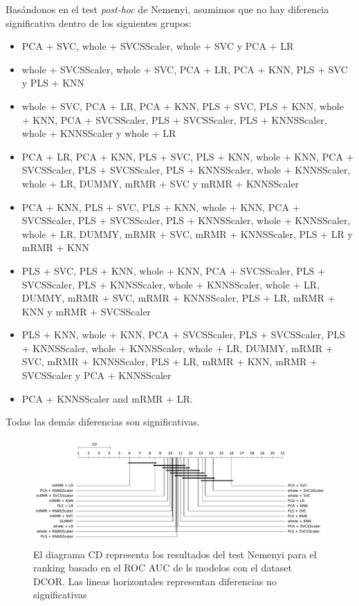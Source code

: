 \documentclass[a4paper,oneside,11pt,leqno]{article}
\begin{document}
	Basándonos en el test \textit{post-hoc} de Nemenyi, asumimos que no hay diferencia significativa dentro de los siguientes grupos:

	\begin{itemize}
		\item  PCA + SVC, whole + SVCSScaler, whole + SVC y PCA + LR

		\item  whole + SVCSScaler, whole + SVC, PCA + LR, PCA + KNN, PLS + SVC y PLS + KNN

		\item whole + SVC, PCA + LR, PCA + KNN, PLS + SVC, PLS + KNN, whole + KNN, PCA + SVCSScaler, PLS + SVCSScaler, PLS + KNNSScaler, whole + KNNSScaler y whole + LR

		\item  PCA + LR, PCA + KNN, PLS + SVC, PLS + KNN, whole + KNN, PCA + SVCSScaler, PLS + SVCSScaler, PLS + KNNSScaler, whole + KNNSScaler, whole + LR, DUMMY, mRMR + SVC y mRMR + KNNSScaler

		\item  PCA + KNN, PLS + SVC, PLS + KNN, whole + KNN, PCA + SVCSScaler, PLS + SVCSScaler, PLS + KNNSScaler, whole + KNNSScaler, whole + LR, DUMMY, mRMR + SVC, mRMR + KNNSScaler, PLS + LR y mRMR + KNN

		\item  PLS + SVC, PLS + KNN, whole + KNN, PCA + SVCSScaler, PLS + SVCSScaler, PLS + KNNSScaler, whole + KNNSScaler, whole + LR, DUMMY, mRMR + SVC, mRMR + KNNSScaler, PLS + LR, mRMR + KNN y mRMR + SVCSScaler

		\item PLS + KNN, whole + KNN, PCA + SVCSScaler, PLS + SVCSScaler, PLS + KNNSScaler, whole + KNNSScaler, whole + LR, DUMMY, mRMR + SVC, mRMR + KNNSScaler, PLS + LR, mRMR + KNN, mRMR + SVCSScaler y PCA + KNNSScaler

		\item PCA + KNNSScaler and mRMR + LR.
	\end{itemize}

	Todas las demás diferencias son significativas.

	\begin{figure}[h]
		\includegraphics[width=\linewidth]{stat_results_dcor.pdf}
		\caption{El diagrama CD representa los resultados del test Nemenyi para el ranking basado en el ROC AUC de ls modelos con el dataset DCOR. Las lineas horizontales representan diferencias no significativas}
		\label{fig:stats_fig_dcor}
	\end{figure}
\end{document}
